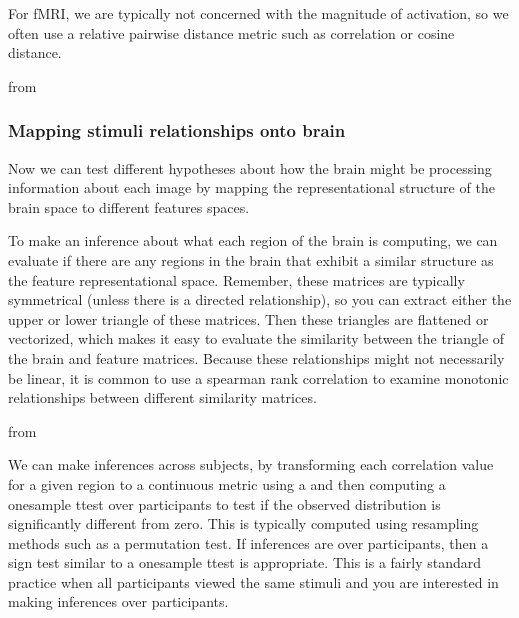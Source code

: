 \documentclass[letterpaper,10pt,english]{sphinxmanual}
\begin{document}
For fMRI, we are typically not concerned with the magnitude of activation, so we often use a relative pairwise distance metric such as correlation or cosine distance.

from 


\subsubsection{Mapping stimuli relationships onto brain}
\label{\detokenize{content/RSA:mapping-stimuli-relationships-onto-brain}}
Now we can test different hypotheses about how the brain might be processing information about each image by mapping the representational structure of the brain space to different features spaces.

To make an inference about what each region of the brain is computing, we can evaluate if there are any regions in the brain that exhibit a similar structure as the feature representational space. Remember, these matrices are typically symmetrical (unless there is a directed relationship), so you can extract either the upper or lower triangle of these matrices. Then these triangles are flattened or vectorized, which makes it easy to evaluate the similarity between the triangle of the brain and feature matrices. Because these relationships might not necessarily be linear, it is common to use a spearman rank correlation to examine monotonic relationships between different similarity matrices.

from 

We can make inferences across subjects, by transforming each correlation value for a given region to a continuous metric using a  and then computing a one\sphinxhyphen{}sample t\sphinxhyphen{}test over participants to test if the observed distribution is significantly different from zero. This is typically computed using resampling methods such as a permutation test. If inferences are over participants, then a sign test similar to a one\sphinxhyphen{}sample t\sphinxhyphen{}test is appropriate. This is a fairly standard practice when all participants viewed the same stimuli and you are interested in making inferences over participants.
\end{document}
